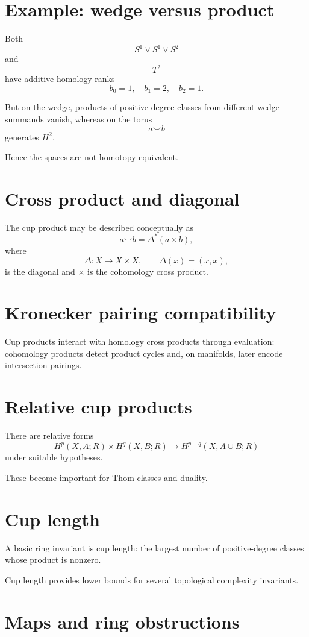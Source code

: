 \section{Example: wedge versus product}

Both
\[
S^1\vee S^1\vee S^2
\]
and
\[
T^2
\]
have additive homology ranks
\[
b_0=1,\quad b_1=2,\quad b_2=1.
\]

But on the wedge, products of positive-degree classes from different wedge
summands vanish, whereas on the torus
\[
a\smile b
\]
generates \(H^2\).

Hence the spaces are not homotopy equivalent.

\section{Cross product and diagonal}

The cup product may be described conceptually as
\[
a\smile b
=
\Delta^*(a\times b),
\]
where
\[
\Delta:X\to X\times X,
\qquad
\Delta(x)=(x,x),
\]
is the diagonal and \(\times\) is the cohomology cross product.

\section{Kronecker pairing compatibility}

Cup products interact with homology cross products through evaluation:
cohomology products detect product cycles and, on manifolds, later encode
intersection pairings.

\section{Relative cup products}

There are relative forms
\[
H^p(X,A;R)\times H^q(X,B;R)
\to
H^{p+q}(X,A\cup B;R)
\]
under suitable hypotheses.

These become important for Thom classes and duality.

\section{Cup length}

A basic ring invariant is cup length: the largest number of positive-degree
classes whose product is nonzero.

Cup length provides lower bounds for several topological complexity
invariants.

\section{Maps and ring obstructions}


